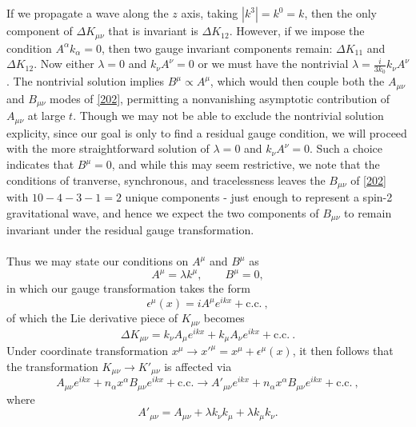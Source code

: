 \documentclass[10pt,letterpaper]{article}
\numberwithin{equation}{subsection}
\begin{document}
\\ \\
If we propagate a wave along the $z$ axis, taking $|k^3| = k^0 = k$, then the only component of $\Delta K_{\mu\nu}$ that is invariant is $\Delta K_{12}$. However, if we impose the condition $A^\alpha k_\alpha = 0$, then two gauge invariant components remain: $\Delta K_{11}$ and $\Delta K_{12}$. 
\newpage
Now either $\lambda =0$ and $k_\nu A^\nu = 0$ or we must have the nontrivial $\lambda = \frac{i}{3k_0} k_\nu A^\nu$. The nontrivial solution implies $B^\mu \propto A^\mu$,
which would then couple both the $A_{\mu\nu}$ and $B_{\mu\nu}$ modes of \eqref{202}, permitting a nonvanishing asymptotic contribution of $A_{\mu\nu}$ at large $t$. 
 Though we may not be able to exclude the nontrivial solution explicity, since our goal is only to find a residual gauge condition, we will proceed with the more straightforward solution of $\lambda = 0$ and $k_\nu A^\nu = 0$. Such a choice indicates that $B^\mu = 0$, and while this may seem restrictive, we note that the conditions of tranverse, synchronous, and tracelessness leaves the $B_{\mu\nu}$ of \eqref{202} with $10-4-3-1 = 2$ unique components - just enough to represent a spin-2 gravitational wave, and hence we expect the two components of $B_{\mu\nu}$ to remain invariant under the residual gauge transformation.
 \\ \\
 \noindent
Thus we may state our conditions on $A^\mu$ and $B^\mu$ as
\begin{equation}
	A^\mu =\lambda k^\mu,\qquad B^\mu = 0,
\end{equation}
in which our gauge transformation takes the form
\begin{equation}
\epsilon^\mu(x) = iA^\mu e^{ikx} + \text{c.c.}\ ,
\end{equation}
of which the Lie derivative piece of $K_{\mu\nu}$ becomes
\begin{equation}
\Delta K_{\mu\nu} =  k_\nu A_\mu e^{ikx} + k_\mu A_\nu e^{ikx} + \text{c.c.}\ .
\end{equation}
Under coordinate transformation $x^\mu \to x'^\mu =  x^\mu + \epsilon^\mu(x)$, it then follows that the transformation $K_{\mu\nu} \to K'_{\mu\nu}$ is affected via
\begin{equation}
A_{\mu\nu} e^{ikx} + n_\alpha x^\alpha B_{\mu\nu}e^{ikx} +\text{c.c.} \to A'_{\mu\nu} e^{ikx} + n_\alpha x^\alpha B_{\mu\nu}e^{ikx}+\text{c.c.}\ ,
\end{equation}
where 
\begin{equation}
A'_{\mu\nu} = A_{\mu\nu} +\lambda  k_\nu k_\mu  + \lambda k_\mu k_\nu.
\end{equation}
\end{document}
